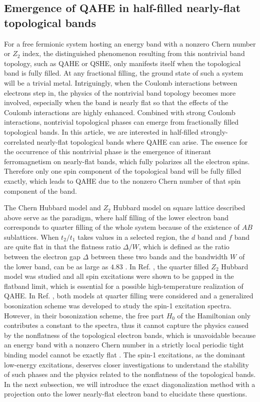 \documentclass[amsmath,superscriptaddress,showpacs,aps,prb,twocolumn]{revtex4-1}
\begin{document}
\subsection{Emergence of QAHE in half-filled nearly-flat topological bands}\label{emerg_qahe}
\par For a free fermionic system hosting an energy band with a nonzero Chern number or $Z_2$ index, the distinguished phenomenon resulting from this nontrivial band topology, such as QAHE or QSHE, only manifests itself when the topological band is fully filled. At any fractional filling, the ground state of such a system will be a trivial metal. Intriguingly, when the Coulomb interactions between electrons step in, the physics of the nontrivial band topology becomes more involved, especially when the band is nearly flat so that the effects of the Coulomb interactions are highly enhanced. Combined with strong Coulomb interactions, nontrivial topological phases can emerge from fractionally filled topological bands. In this article, we are interested in half-filled strongly-correlated nearly-flat topological bands where QAHE can arise\cite{NSCM_PRL2011,DG_PRB2015}. The essence for the occurrence of this nontrivial phase is the emergence of itinerant ferromagnetism on nearly-flat bands\cite{T_PTP1998}, which fully polarizes all the electron spins. Therefore only one spin component of the topological band will be fully filled exactly, which leads to QAHE due to the nonzero Chern number of that spin component of the band.

\par The Chern Hubbard model and $Z_2$ Hubbard model on square lattice described above serve as the paradigm, where half filling of the lower electron band corresponds to quarter filling of the whole system because of the existence of $AB$ sublattices. When $t_2/t_1$ takes values in a selected region, the $d$ band and $f$ band are quite flat in that the flatness ratio $\Delta/W$, which is defined as the ratio between the electron gap $\Delta$ between these two bands and the bandwidth $W$ of the lower band, can be as large as $4.83$ \cite{NSCM_PRL2011,DG_PRB2015}. In Ref. \cite{NSCM_PRL2011}, the quarter filled $Z_2$ Hubbard model was studied and all spin excitations were shown to be gapped in the flatband limit, which is essential for a possible high-temperature realization of QAHE. In Ref. \cite{DG_PRB2015}, both models at quarter filling were considered and a generalized bosonization scheme was developed to study the spin-1 excitation spectra. However, in their bosonization scheme, the free part $H_0$ of the Hamiltonian only contributes a constant to the spectra, thus it cannot capture the physics caused by the nonflatness of the topological electron bands, which is unavoidable because an energy band with a nonzero Chern number in a strictly local periodic tight binding model cannot be exactly flat \cite{CMST_JPMT2014}. The spin-1 excitations, as the dominant low-energy excitations, deserves closer investigations to understand the stability of such phases and the physics related to the nonflatness of the topological bands. In the next subsection, we will introduce the exact diagonalization method with a projection onto the lower nearly-flat electron band to elucidate these questions.
\end{document}
